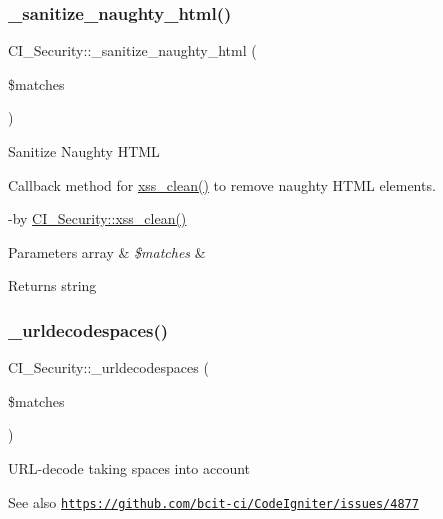 \subsubsection{\texorpdfstring{\+\_\+sanitize\+\_\+naughty\+\_\+html()}{\_sanitize\_naughty\_html()}}
{\footnotesize\ttfamily C\+I\+\_\+\+Security\+::\+\_\+sanitize\+\_\+naughty\+\_\+html (\begin{DoxyParamCaption}\item[{}]{\$matches }\end{DoxyParamCaption})\hspace{0.3cm}{\ttfamily [protected]}}

Sanitize Naughty H\+T\+ML

Callback method for \mbox{\hyperlink{class_c_i___security_a2a5bb2a641bd37cbae73a96ee35dee30}{xss\+\_\+clean()}} to remove naughty H\+T\+ML elements.

-\/by \mbox{\hyperlink{class_c_i___security_a2a5bb2a641bd37cbae73a96ee35dee30}{C\+I\+\_\+\+Security\+::xss\+\_\+clean()}} 
\begin{DoxyParams}[1]{Parameters}
array & {\em \$matches} & \\
\hline
\end{DoxyParams}
\begin{DoxyReturn}{Returns}
string 
\end{DoxyReturn}
\mbox{\label{class_c_i___security_a560c9099c1f93c954eac4f4c6185b768}} 
\subsubsection{\texorpdfstring{\+\_\+urldecodespaces()}{\_urldecodespaces()}}
{\footnotesize\ttfamily C\+I\+\_\+\+Security\+::\+\_\+urldecodespaces (\begin{DoxyParamCaption}\item[{}]{\$matches }\end{DoxyParamCaption})\hspace{0.3cm}{\ttfamily [protected]}}

U\+R\+L-\/decode taking spaces into account

\begin{DoxySeeAlso}{See also}
\href{https://github.com/bcit-ci/CodeIgniter/issues/4877}{\tt https\+://github.\+com/bcit-\/ci/\+Code\+Igniter/issues/4877} 
\end{DoxySeeAlso}

